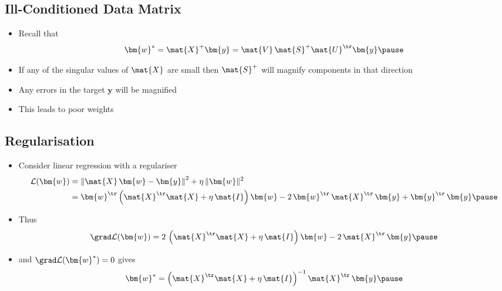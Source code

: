 \begin{slide}
\section{Ill-Conditioned Data Matrix}

\begin{PauseHighLight}
  \begin{itemize}
  \item Recall that
    \begin{align*}
      \bm{w}^* = \mat{X}^{+} \bm{y} =  \mat{V}\,\mat{S}^{+} \mat{U}^\tr \bm{y}\pause
    \end{align*}
  \item If any of the singular values of $\mat{X}$ are small then
    $\mat{S}^{+}$ will magnify components in that direction\pause
  \item Any errors in the target $\bm{y}$ will be magnified\pause
  \item This leads to poor weights\pause
  \end{itemize}
\end{PauseHighLight}

\end{slide}


\begin{slide}
\section{Regularisation}

\begin{PauseHighLight}
  \begin{itemize}
  \item Consider linear regression with a regulariser
    \begin{align*}
      \mathcal{L}(\bm{w})
      &=  \left\| \mat{X}\,\bm{w} - \bm{y} \right\|^2 + \eta \, \|\bm{w}\|^2
      \\
      &= \bm{w}^\tr \left(\mat{X}^\tr \mat{X} + \eta \, \mat{I}
        \right) \bm{w}  - 2 \, \bm{w}^\tr \, \mat{X}^\tr \, \bm{y} +
        \bm{y}^\tr\,\bm{y} \pause
    \end{align*}
  \item Thus
    \begin{align*}
      \grad \mathcal{L}(\bm{w}) = 2 \,
      \left(\mat{X}^\tr \mat{X} + \eta \, \mat{I} \right) \bm{w}
      - 2 \, \mat{X}^\tr \, \bm{y}\pause
    \end{align*}
  \item and $\grad \mathcal{L}(\bm{w}^*)=0$ gives
    \begin{align*}
      \bm{w}^* = \left(\mat{X}^\tr \mat{X} + \eta \, \mat{I}
      \right)^{-1} \mat{X}^\tr \, \bm{y}\pause
    \end{align*}
  \end{itemize}
\end{PauseHighLight}

\end{slide}

